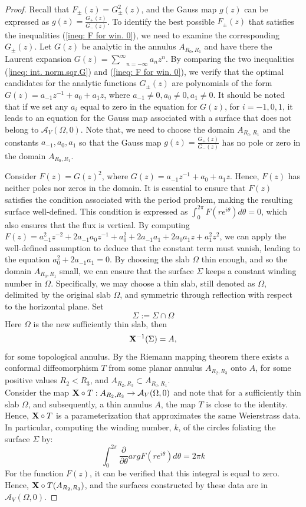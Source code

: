 \documentclass[11pt]{amsart}
\numberwithin{equation}{section}
\theoremstyle{theorem}
\theoremstyle{definition}
\numberwithin{equation}{section}
\begin{document}
\begin{proof}
Recall that $F_{\pm}(z)=G_{\pm}^2(z)$, and the Gauss map $g(z)$ can be expressed as $g(z) = \frac{G_+(z)}{G_-(z)}$.
 To identify the best possible $F_{\pm}(z)$ that satisfies the inequalities (\ref{ineq: F for win. 0}), we need to examine the corresponding $G_{\pm}(z)$. Let $G(z)$ be analytic in the annulus $A_{R_0,R_1}$ and have there the Laurent expansion $G(z)=\underset{n=-\infty}{\overset{\infty}{\sum}}a_nz^n$. By comparing the two inequalities (\ref{ineq: int. norm.sqr.G}) and (\ref{ineq: F for win. 0}), we verify that the optimal candidates for the analytic functions $G_{\pm}(z)$ are polynomials of the form $G(z)= a_{-1}z^{-1} + a_0 + a_1z$, where $a_{-1}\neq 0, a_0\neq 0, a_1\neq 0$. 
 It should be noted that if we set any $a_i$ equal to zero in the equation for $G(z)$, for $i=-1,0,1$, it leads to an equation for the Gauss map associated with a surface that does not belong to $\mathcal{A}_V(\Omega ,0)$. Note that, we need to choose the domain $A_{R_0,R_1}$ and the constants $a_{-1},a_0,a_1$ so that the Gauss map $g(z)=\frac{G_+(z)}{G_-(z)}$ has no pole or zero in the domain $A_{R_0,R_1}$.
\medskip

 Consider $F(z)=G(z)^2 $, where $G(z)= a_{-1}z^{-1} + a_0 + a_1z$. Hence, $F(z)$ has neither poles nor zeros in the domain.  It is essential to ensure that $F(z)$ satisfies the condition associated with the period problem, making the resulting surface well-defined. This condition is expressed as $\int_{0}^{2\pi} F(re^{i\theta})d\theta =0$, which also ensures that the flux is vertical. By computing $F(z)=a_{-1}^{2}z^{-2}+2a_{-1}a_0z^{-1}+ a_0^2 + 2a_{-1}a_1 + 2a_0a_1z+a_1^2z^2$, we can apply the well-defined assumption to deduce that the constant term must vanish, leading to the equation $a_0^2 + 2a_{-1}a_1 =0$. 
By choosing the slab $\Omega$ thin enough, and so the domain $A_{R_0,R_1}$ small, we can ensure that the surface $\Sigma$ keeps a constant winding number in $\Omega$. Specifically, we may choose a thin slab, still denoted as $\Omega$, delimited by the original slab $\Omega$, and symmetric through reflection with respect to the horizontal plane. Set
$$
\Sigma := \Sigma \cap \Omega
$$
Here $\Omega$ is the new sufficiently thin slab, then
$$
\bold{X}^{-1}(\Sigma)=A ,
$$
for some topological annulus. By the Riemann mapping theorem there exists a conformal diffeomorphism $T$ from some planar annulus $A_{R_2,R_3}$ onto $A$, for some positive values $R_2 < R_3$, and $A_{R_2,R_3} \subset A_{R_0,R_1}$.\\
Consider the map $\bold{X}\circ T: A_{R_2,R_3}\rightarrow \mathcal{A}_V(\Omega ,0)$ and note that for a sufficiently thin slab $\Omega$, and subsequently, a thin annulus $A$, the map $T$ is close to the identity. Hence, $\bold{X}\circ T$ is a parameterization that approximates the same Weierstrass data.\\
In particular, computing the winding number, $k$, of the circles foliating the surface $\Sigma$ by:
$$
\int_0^{2\pi} \frac{\partial}{\partial \theta} arg F(re^{i\theta}) d\theta =2\pi k
$$
For the function $F(z)$, it can be verified that this integral is equal to zero. Hence, $\bold{X}\circ T(A_{R_2,R_3})$, and the surfaces constructed by these data are in $\mathcal{A}_V(\Omega ,0)$. 
\medskip


\end{proof}
\end{document}
